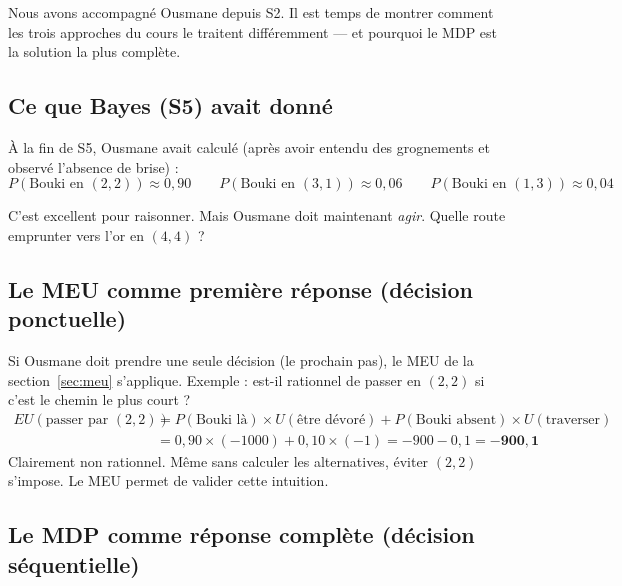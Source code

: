 \documentclass[11pt,a4paper]{article}
\begin{document}
Nous avons accompagné Ousmane depuis S2. Il est temps de montrer comment les trois approches du cours le traitent différemment --- et pourquoi le MDP est la solution la plus complète.

\subsection{Ce que Bayes (S5) avait donné}

À la fin de S5, Ousmane avait calculé (après avoir entendu des grognements et observé l'absence de brise) :
$$P(\text{Bouki en }(2,2)) \approx 0{,}90 \qquad P(\text{Bouki en }(3,1)) \approx 0{,}06 \qquad P(\text{Bouki en }(1,3)) \approx 0{,}04$$

C'est excellent pour raisonner. Mais Ousmane doit maintenant \textit{agir}. Quelle route emprunter vers l'or en $(4,4)$ ?

\subsection{Le MEU comme première réponse (décision ponctuelle)}

Si Ousmane doit prendre une seule décision (le prochain pas), le MEU de la section~\ref{sec:meu} s'applique. Exemple : est-il rationnel de passer en $(2,2)$ si c'est le chemin le plus court ?
\begin{align*}
EU(\text{passer par }(2,2)) &= P(\text{Bouki là}) \times U(\text{être dévoré}) + P(\text{Bouki absent}) \times U(\text{traverser}) \\
&= 0{,}90 \times (-1000) + 0{,}10 \times (-1) = -900 - 0{,}1 = \mathbf{-900{,}1}
\end{align*}
Clairement non rationnel. Même sans calculer les alternatives, éviter $(2,2)$ s'impose. Le MEU permet de valider cette intuition.

\subsection{Le MDP comme réponse complète (décision séquentielle)}
\end{document}
